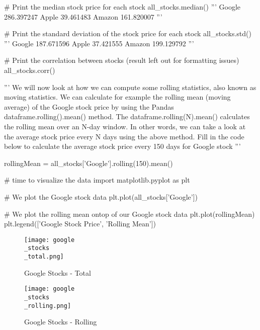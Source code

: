 \documentclass{article}
\begin{document}
\begin{python}
	# Print the median stock price for each stock
	all_stocks.median()
	'''
	Google    286.397247
	Apple      39.461483
	Amazon    161.820007
	'''
	
	# Print the standard deviation of the stock price for each stock  
	all_stocks.std()
	'''
	Google    187.671596
	Apple      37.421555
	Amazon    199.129792
	'''
	
	# Print the correlation between stocks (result left out for formatting issues)
	all_stocks.corr()
	
	
	'''
	We will now look at how we can compute some rolling statistics, also known as moving statistics.
	We can calculate for example the rolling mean (moving average) of the Google stock price by using the
	Pandas dataframe.rolling().mean() method. The dataframe.rolling(N).mean() calculates the rolling mean over
	an N-day window. In other words, we can take a look at the average stock price every N days using
	the above method. Fill in the code below to calculate the average stock price every 150 days for
	Google stock
	'''
	
	rollingMean = all_stocks['Google'].rolling(150).mean()
	
	# time to visualize the data
	import matplotlib.pyplot as plt
	
	# We plot the Google stock data
	plt.plot(all_stocks['Google'])
	
	# We plot the rolling mean ontop of our Google stock data
	plt.plot(rollingMean)
	plt.legend(['Google Stock Price', 'Rolling Mean'])
\end{python}

\newpage
\begin{figure}
	\texttt{[image: google\\\_stocks\\\_total.png]}
	\caption{Google Stocks - Total}\label{fig:google_total}
\end{figure}

\begin{figure}
	\texttt{[image: google\\\_stocks\\\_rolling.png]}
	\caption{Google Stocks - Rolling}\label{fig:google_rolling}
\end{figure}
\end{document}

